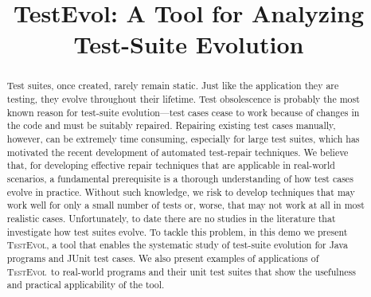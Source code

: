 \documentclass[conference]{IEEEtran}
\newcommand{\tool}{\textsc{TestEvol}\xspace}
\begin{document}
\title{TestEvol: A Tool for Analyzing Test-Suite Evolution}

\author{
}

\maketitle

\pagestyle{empty}





\begin{abstract}
  Test suites, once created, rarely remain static. Just like the
  application they are testing, they evolve throughout their lifetime.
  Test obsolescence is probably the most known reason for test-suite
  evolution---test cases cease to work because of changes in the code
  and must be suitably repaired. Repairing existing test cases
  manually, however, can be extremely time consuming, especially for
  large test suites, which has motivated the recent development of
  automated test-repair techniques. We believe that, for developing
  effective repair techniques that are applicable in real-world
  scenarios, a fundamental prerequisite is a thorough understanding of
  how test cases evolve in practice. Without such knowledge, we risk
  to develop techniques that may work well for only a small number of
  tests or, worse, that may not work at all in most realistic cases.
  Unfortunately, to date there are no studies in the literature that
  investigate how test suites evolve. To tackle this problem, in this
  demo we present \tool, a tool that enables the systematic study of
  test-suite evolution for Java programs and JUnit test cases. We also
  present examples of applications of \tool\ to real-world programs
  and their unit test suites that show the usefulness and practical
  applicability of the tool.
\end{abstract}
\end{document}
